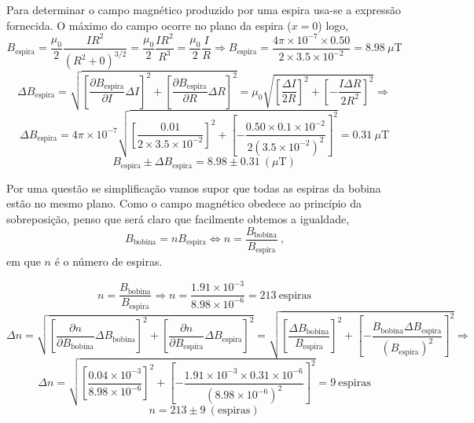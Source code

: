 \documentclass[11pt,a4paper,final]{article}
\begin{document}
Para determinar o campo magn\'{e}tico produzido por uma espira usa-se a express\~{a}o fornecida. O m\'{a}ximo do campo ocorre no plano da espira ($x=0$) logo,
\begin{equation*}
B_\text{espira}=\frac{\mu_0}{2}\frac{IR^2}{\left(R^2+0\right)^{3/2}} 
=\frac{\mu_0}{2}\frac{IR^2}{R^3}
=\frac{\mu_0}{2}\frac{I}{R}
\Rightarrow
B_\text{espira}=\frac{4\pi\times10^{-7}\times 0.50}{2\times3.5\times10^{-2}}
=8.98~\mu\text{T}
\end{equation*}
\begin{equation*}
\Delta B_\text{espira}=\sqrt{\left[\frac{\partial B_\text{espira}}{\partial I}\Delta I\right]^2+\left[\frac{\partial B_\text{espira}}{\partial R}\Delta R\right]^2} = \mu_0\sqrt{\left[\frac{\Delta I}{2R}\right]^2+\left[-\frac{ I \Delta R}{2R^2}\right]^2} \Rightarrow
\end{equation*}
\begin{equation*}
\Delta B_\text{espira}=4\pi\times10^{-7}\sqrt{\left[\frac{0.01}{2 \times 3.5 \times 10^{-2}}\right]^2+\left[-\frac{0.50 \times 0.1 \times 10^{-2}}{2 \left(3.5 \times 10^{-2}\right)^2}\right]^2}
=0.31~\mu\text{T}
\end{equation*}
\begin{equation*}
\boxed{B_\text{espira} \pm \Delta B_\text{espira} =8.98 \pm 0.31~(\mu\text{T})}
\end{equation*}

Por uma quest\~{a}o se simplifica\c{c}\~{a}o vamos supor que todas as espiras da bobina est\~{a}o no mesmo plano. Como o campo magn\'{e}tico obedece ao princ\'{i}pio da sobreposição, penso que ser\'{a} claro que facilmente obtemos a igualdade,
\begin{equation*}
B_\text{bobina}=nB_\text{espira} \Leftrightarrow
n=\frac{B_\text{bobina}}{B_\text{espira}}~\text{,}
\end{equation*}
\noindent em que $n$ \'{e} o n\'{u}mero de espiras.

\begin{equation*}
n=\frac{B_\text{bobina}}{B_\text{espira}} \Rightarrow
n=\frac{1.91 \times 10^{-3}}{8.98 \times 10^{-6}}=213~\text{espiras}
\end{equation*}
\begin{equation*}
\Delta n=\sqrt{\left[\frac{\partial n}{\partial B_\text{bobina}}\Delta B_\text{bobina}\right]^2+\left[\frac{\partial n}{\partial B_\text{espira}}\Delta B_\text{espira}\right]^2}
=\sqrt{\left[\frac{\Delta B_\text{bobina}}{B_\text{espira}}\right]^2+\left[-\frac{B_\text{bobina} \Delta B_\text{espira}}{\left(B_\text{espira}\right)^2}\right]^2}\Rightarrow
\end{equation*}
\begin{equation*}
\Delta n=\sqrt{\left[\frac{0.04 \times 10^{-3}}{8.98 \times 10^{-6}}\right]^2+\left[-\frac{1.91\times 10^{-3} \times 0.31 \times 10^{-6}}{\left(8.98 \times 10^{-6}\right)^2}\right]^2}
=9~\text{espiras}
\end{equation*}
\begin{equation*}
\boxed{n=213\pm9~(\text{espiras})}
\end{equation*}
\end{document}
